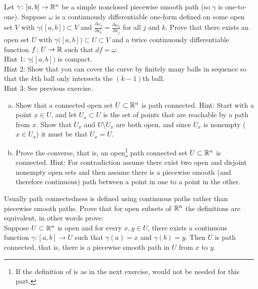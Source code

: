 \begin{exercise}[Hard]
Let $\gamma \colon [a,b] \to {\mathbb{R}}^n$ be a simple nonclosed piecewise smooth
path (so $\gamma$
is one-to-one).  Suppose $\omega$ is a continuously differentiable
one-form defined on some open
set $V$ with $\gamma\bigl([a,b]\bigr) \subset V$ and
$\frac{\partial \omega_j}{\partial x_k} = \frac{\partial \omega_k}{\partial
x_j}$
for all $j$ and $k$.  Prove that there exists an open set $U$
with $\gamma\bigl([a,b]\bigr) \subset U \subset V$ and
a twice continuously differentiable function $f \colon U \to {\mathbb{R}}$
such that $df = \omega$.
\\
Hint 1: $\gamma\bigl([a,b]\bigr)$ is compact.\\
Hint 2: Show that you can cover the curve by finitely many balls in sequence
so that the $k$th ball only intersects the $(k-1)$th ball.\\
Hint 3: See previous exercise.
\end{exercise}

\begin{exercise}
\pagebreak[2]
\leavevmode
\begin{enumerate}[a)]
\item
Show that a connected open set $U \subset {\mathbb{R}}^n$ is path connected.
Hint: Start with a
point $x \in U$, and let $U_x \subset U$ is the set of points that are
reachable by a path from $x$.  Show that $U_x$ and $U \setminus U_x$
are both open, and since $U_x$ is nonempty ($x \in U_x$) it must be
that $U_x = U$.
\item
Prove the converse, that is, an open\footnote{If the
definition of  is as in the next exercise,
 would not be needed for this part.}
path connected set $U \subset {\mathbb{R}}^n$ is
connected.  Hint: For contradiction assume there exist two open and disjoint nonempty open
sets and then assume there is a piecewise smooth (and therefore continuous)
path between a point in one to a point in the other.
\end{enumerate}
\end{exercise}

\begin{exercise}
Usually path connectedness is defined using continuous paths rather
than piecewise smooth paths.  Prove that for open subsets of ${\mathbb{R}}^n$
the definitions are equivalent, in
other words prove:\\
Suppose $U \subset {\mathbb{R}}^n$ is open and for every $x,y \in U$, there exists a continuous function
$\gamma \colon [a,b] \to U$ such that $\gamma(a) = x$ and $\gamma(b) = y$.
Then $U$ is path connected, that is, there is a piecewise smooth path in $U$ from
$x$ to $y$.
\end{exercise}

